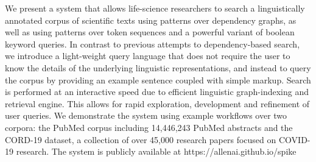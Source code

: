 We present a system that allows life-science researchers to search a linguistically annotated corpus of scientific texts using patterns over dependency graphs, as well as using patterns over token sequences and a powerful variant of boolean keyword queries. In contrast to previous attempts to dependency-based search, we introduce a light-weight query language that does not require the user to know the details of the underlying linguistic representations, and instead to query the corpus by providing an example sentence coupled with simple markup. Search is performed at an interactive speed due to efficient linguistic graph-indexing and retrieval engine. This allows for rapid exploration, development and refinement of user queries. We demonstrate the system using example workflows over two corpora: the PubMed corpus including 14,446,243 PubMed abstracts and the CORD-19 dataset, a collection of over 45,000 research papers focused on COVID-19 research. The system is publicly available at https://allenai.github.io/spike
